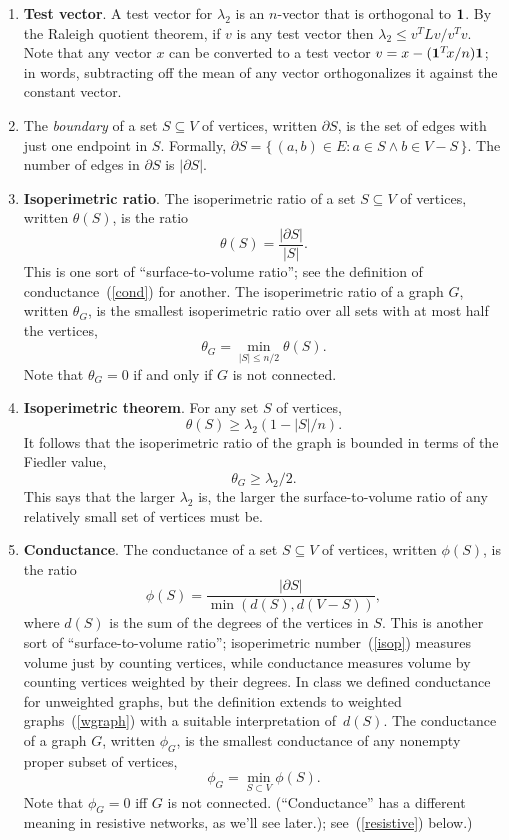 \documentclass[11pt]{article}
\newcommand{\m}[1]{{\bf{#1}}}       %
\newcommand{\ones}{\m1}             %
\begin{document}
\begin{enumerate}
\item{\bf Test vector}.
A test vector for $\lambda_2$ is an $n$-vector that is
orthogonal to $\ones$.  By the Raleigh quotient theorem,
if $v$ is any test vector then $\lambda_2 \leq v^TLv/v^Tv$.
Note that any vector $x$ can be converted to a test vector 
$v = x - (\ones^T\!x/n) \ones$; in words, subtracting off
the mean of any vector orthogonalizes it against the constant
vector.

\item
The {\em boundary} of a set $S\subseteq V$ of vertices, written $\partial S$,
is the set of edges with just one endpoint in $S$. Formally,
$\partial S = \{\,(a,b)\in E : a \in S \wedge b \in V-S\,\}$.
The number of edges in $\partial S$ is $|\partial S|$.

\item\label{isop}{\bf Isoperimetric ratio}.
The isoperimetric ratio of a set $S\subseteq V$ of vertices,
written $\theta(S)$, is the ratio
$$\theta(S) = \frac{|\partial S|}{|S|}.$$
This is one sort of ``surface-to-volume ratio''; 
see the definition of conductance~(\ref{cond}) 
for another.
The isoperimetric ratio of a graph $G$,
written $\theta_G$, is the smallest isoperimetric ratio over all 
sets with at most half the vertices,
$$\theta_G = \min_{|S|\leq n/2}\theta(S).$$
Note that $\theta_G=0$ if and only if $G$ is not connected.

\item\label{isopthm} {\bf Isoperimetric theorem}.
For any set $S$ of vertices, 
$$\theta(S) \geq \lambda_2(1-|S|/n).$$
It follows that the isoperimetric ratio of the graph is bounded 
in terms of the Fiedler value,
$$\theta_G \geq \lambda_2/2.$$
This says that the larger $\lambda_2$ is, the larger the surface-to-volume
ratio of any relatively small set of vertices must be.

\item\label{cond}{\bf Conductance}.
The conductance of a set $S\subseteq V$ of vertices,
written $\phi(S)$, is the ratio 
$$\phi(S) = \frac{|\partial S|}{\min(d(S),d(V-S))},$$
where $d(S)$ is the sum of the degrees of the vertices in $S$.
This is another sort of ``surface-to-volume ratio'';
isoperimetric number~(\ref{isop}) measures volume just by counting vertices, 
while conductance measures volume by counting vertices weighted by their degrees.
In class we defined conductance for unweighted graphs,
but the definition extends to weighted graphs~(\ref{wgraph}) with
a suitable interpretation of~$d(S)$.
The conductance of a graph $G$,
written $\phi_G$, is the smallest conductance of any nonempty 
proper subset of vertices,
$$\phi_G = \min_{S\subset V}\phi(S).$$
Note that $\phi_G=0$ iff $G$ is not connected.
(``Conductance'' has a different meaning in resistive networks, as we'll see later.); see~(\ref{resistive}) below.)


\end{enumerate}
\end{document}
